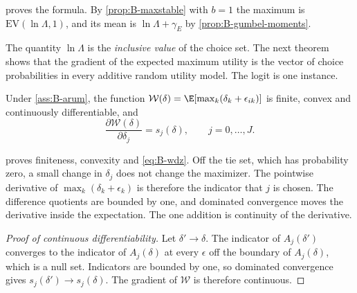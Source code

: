  proves the formula. By \cref{prop:B-maxstable} with $b = 1$ the maximum is
$\mathrm{EV}(\ln\Lambda, 1)$, and its mean is $\ln\Lambda + \gamma_E$ by \cref{prop:B-gumbel-moments}.

The quantity $\ln\Lambda$ is the \emph{inclusive value} of the choice set. The next theorem shows that the
gradient of the expected maximum utility is the vector of choice probabilities in every additive random
utility model. The logit is one instance.

\begin{theorem}\label{thm:B-wdz}
Under \cref{ass:B-arum}, the function $\mathcal{W}(\delta) = \E[\max_k(\delta_k + \epsilon_{ik})]$ is finite, convex and
continuously differentiable, and
\begin{equation}\label{eq:B-wdz}
\frac{\partial\mathcal{W}(\delta)}{\partial\delta_j} = s_j(\delta), \qquad j = 0, \dots, J .
\end{equation}
\end{theorem}

 proves finiteness, convexity and \eqref{eq:B-wdz}. Off the tie set, which has probability
zero, a small change in $\delta_j$ does not change the maximizer. The pointwise derivative of
$\max_k(\delta_k + \epsilon_k)$ is therefore the indicator that $j$ is chosen. The difference quotients are bounded by
one, and dominated convergence moves the derivative inside the expectation. The one addition is continuity of
the derivative.

\begin{proof}[Proof of continuous differentiability]
Let $\delta' \to \delta$. The indicator of $A_j(\delta')$ converges to the indicator of $A_j(\delta)$ at every
$\epsilon$ off the boundary of $A_j(\delta)$, which is a null set. Indicators are bounded by one, so dominated
convergence gives $s_j(\delta') \to s_j(\delta)$. The gradient of $\mathcal{W}$ is therefore continuous.
\end{proof}

